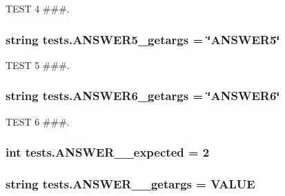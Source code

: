 T\+E\+S\+T 4 \#\#\#. 

\hypertarget{namespacetests_ad4b24de5f60a3dd05787f03cc9b5c2d9}{}
\subsubsection[{A\+N\+S\+W\+E\+R5\+\_\+getargs}]{\setlength{\rightskip}{0pt plus 5cm}string tests.\+A\+N\+S\+W\+E\+R5\+\_\+getargs = \char`\"{}A\+N\+S\+W\+E\+R5\char`\"{}}\label{namespacetests_ad4b24de5f60a3dd05787f03cc9b5c2d9}


T\+E\+S\+T 5 \#\#\#. 

\hypertarget{namespacetests_a7cf4f66934be710101c8bdb7be6b4aa2}{}
\subsubsection[{A\+N\+S\+W\+E\+R6\+\_\+getargs}]{\setlength{\rightskip}{0pt plus 5cm}string tests.\+A\+N\+S\+W\+E\+R6\+\_\+getargs = \char`\"{}A\+N\+S\+W\+E\+R6\char`\"{}}\label{namespacetests_a7cf4f66934be710101c8bdb7be6b4aa2}


T\+E\+S\+T 6 \#\#\#. 

\hypertarget{namespacetests_a66a03482e4412871b8bbd4f0c29fcc1c}{}
\subsubsection[{A\+N\+S\+W\+E\+R\+\_\+1\+\_\+expected}]{\setlength{\rightskip}{0pt plus 5cm}int tests.\+A\+N\+S\+W\+E\+R\+\_\+\_\+expected = 2}\label{namespacetests_a66a03482e4412871b8bbd4f0c29fcc1c}
\hypertarget{namespacetests_a65680861a9d364da0a53575e7f91cb2e}{}
\subsubsection[{A\+N\+S\+W\+E\+R\+\_\+1\+\_\+getargs}]{\setlength{\rightskip}{0pt plus 5cm}string tests.\+A\+N\+S\+W\+E\+R\+\_\+\_\+getargs = \textquotesingle{}V\+A\+L\+U\+E\textquotesingle{}}\label{namespacetests_a65680861a9d364da0a53575e7f91cb2e}
\hypertarget{namespacetests_ae42eabc36e6ab074bbcf241bcfe07c3f}{}
